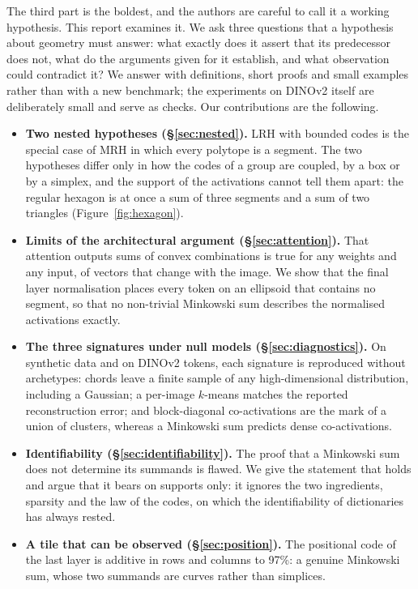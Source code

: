 \documentclass[sigconf,nonacm,screen]{acmart}
\begin{document}
The third part is the boldest, and the authors are careful to call it a working hypothesis. This report
examines it. We ask three questions that a hypothesis about geometry must answer: what exactly does it
assert that its predecessor does not, what do the arguments given for it establish, and what observation
could contradict it? We answer with definitions, short proofs and small examples rather than with a new
benchmark; the experiments on DINOv2 itself are deliberately small and serve as checks. Our contributions are the following.

\begin{itemize}
  \item \textbf{Two nested hypotheses (\S\ref{sec:nested}).} LRH with bounded codes is the special case of
  MRH in which every polytope is a segment. The two hypotheses differ only in how the codes of a group
  are coupled, by a box or by a simplex, and the support of the activations cannot tell them apart: the
  regular hexagon is at once a sum of three segments and a sum of two triangles
  (Figure~\ref{fig:hexagon}).
  \item \textbf{Limits of the architectural argument (\S\ref{sec:attention}).} That attention outputs sums
  of convex combinations is true for any weights and any input, of vectors that change with the image.
  We show that the final layer normalisation places every token on an ellipsoid that contains no
  segment, so that no non-trivial Minkowski sum describes the normalised activations exactly.
  \item \textbf{The three signatures under null models (\S\ref{sec:diagnostics}).} On synthetic data and on
  DINOv2 tokens, each signature is reproduced without archetypes: chords leave a finite sample of any
  high-dimensional distribution, including a Gaussian; a per-image $k$-means matches the reported
  reconstruction error; and block-diagonal co-activations are the mark of a union of clusters, whereas a
  Minkowski sum predicts dense co-activations.
  \item \textbf{Identifiability (\S\ref{sec:identifiability}).} The proof that a Minkowski sum does not
  determine its summands is flawed. We give the statement that holds and argue that it bears on supports
  only: it ignores the two ingredients, sparsity and the law of the codes, on which the identifiability of
  dictionaries has always rested.
  \item \textbf{A tile that can be observed (\S\ref{sec:position}).} The positional code of the last layer
  is additive in rows and columns to 97\%: a genuine Minkowski sum, whose two summands are curves rather
  than simplices.
\end{itemize}
\end{document}
